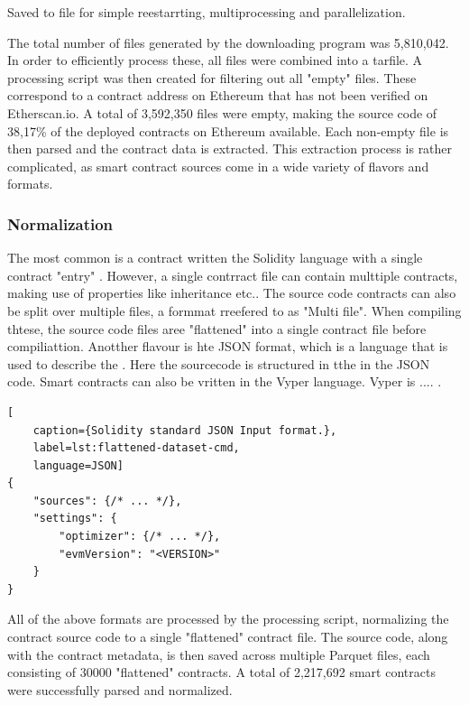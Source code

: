 Saved to file for simple reestarrting, multiprocessing and parallelization.

The total number of files generated by the downloading program was 5,810,042. In order to efficiently process these, all files were combined into a tarfile. A processing script was then created for filtering out all "empty" files. These correspond to a contract address on Ethereum that has not been verified on Etherscan.io. A total of 3,592,350 files were empty, making the source code of 38,17\% of the deployed contracts on Ethereum available. Each non-empty file is then parsed and the contract data is extracted. This extraction process is rather complicated, as smart contract sources come in a wide variety of flavors and formats.

\subsubsection{Normalization}
The most common is a contract written the Solidity language with  a single contract "entry"  . However, a single contrract file can contain multtiple contracts, making use of properties like inheritance etc.. The source code contracts can also be split over multiple files, a formmat rreefered to as "Multi file". When compiling thtese, the source code files aree "flattened" into a single contract file before compiliattion. Anotther flavour is hte JSON format, which is a language that is used to describe the . Here the sourcecode is structured in tthe in the JSON code. Smart contracts can also be vritten in the Vyper language. Vyper is .... .


\begin{lstlisting}[
    caption={Solidity standard JSON Input format.},
    label=lst:flattened-dataset-cmd,
    language=JSON]
{
    "sources": {/* ... */},
    "settings": {
        "optimizer": {/* ... */},
        "evmVersion": "<VERSION>"
    }
}
\end{lstlisting}

All of the above formats are processed by the processing script, normalizing the contract source code to a single "flattened" contract file. The source code, along with the contract metadata, is then saved across multiple Parquet files, each consisting of 30000 "flattened" contracts. A total of 2,217,692 smart contracts were successfully parsed and normalized.

